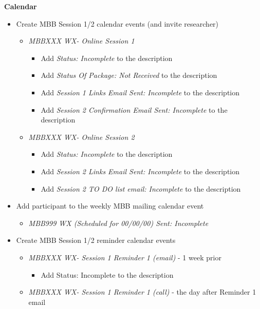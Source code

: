 \documentclass[]{book}
\providecommand{\tightlist}{%
  \setlength{\itemsep}{0pt}\setlength{\parskip}{0pt}}
\begin{document}
\textbf{Calendar}

\begin{itemize}
\tightlist
\item
  Create MBB Session 1/2 calendar events (and invite researcher)

  \begin{itemize}
  \tightlist
  \item
    \emph{MBBXXX WX- Online Session 1}

    \begin{itemize}
    \tightlist
    \item
      Add \emph{Status: Incomplete} to the description
    \item
      Add \emph{Status Of Package: Not Received} to the description
    \item
      Add \emph{Session 1 Links Email Sent: Incomplete} to the description
    \item
      Add \emph{Session 2 Confirmation Email Sent: Incomplete} to the description
    \end{itemize}
  \item
    \emph{MBBXXX WX- Online Session 2}

    \begin{itemize}
    \tightlist
    \item
      Add \emph{Status: Incomplete} to the description
    \item
      Add \emph{Session 2 Links Email Sent: Incomplete} to the description
    \item
      Add \emph{Session 2 TO DO list email: Incomplete} to the description
    \end{itemize}
  \end{itemize}
\item
  Add participant to the weekly MBB mailing calendar event

  \begin{itemize}
  \tightlist
  \item
    \emph{MBB999 WX (Scheduled for 00/00/00) Sent: Incomplete}
  \end{itemize}
\item
  Create MBB Session 1/2 reminder calendar events

  \begin{itemize}
  \tightlist
  \item
    \emph{MBBXXX WX- Session 1 Reminder 1 (email)} - 1 week prior

    \begin{itemize}
    \tightlist
    \item
      Add Status: Incomplete to the description
    \end{itemize}
  \item
    \emph{MBBXXX WX- Session 1 Reminder 1 (call)} - the day after Reminder 1 email


\end{itemize}
\end{itemize}
\end{document}
